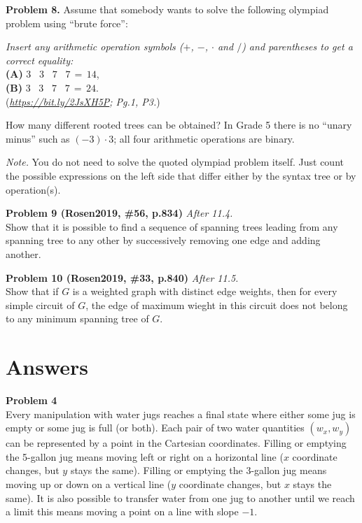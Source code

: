 \documentclass[jou]{apa6}
\begin{document}
\vspace{6pt}
{\bf Problem 8.}
Assume that somebody wants to solve the following olympiad problem using ``brute force'':
\begin{mdframed}[roundcorner=6pt]
{\em Insert any arithmetic operation symbols ($+$, $-$, $\cdot$ and $/$) and
parentheses to get a correct equality:}\\
{\bf (A)} $3\;\;\;3\;\;\;7\;\;\;7\,=\,14$,\\
{\bf (B)} $3\;\;\;3\;\;\;7\;\;\;7\,=\,24$.\\
({\em \url{https://bit.ly/2JsXH5P}; Pg.1, P3.})
\end{mdframed}
How many different rooted trees can be obtained?
In Grade 5 there is no ``unary minus'' such as $(-3)\cdot 3$;
all four arithmetic operations are binary.

{\em Note.} 
You do not need to solve the quoted olympiad 
problem itself. Just count the possible expressions on the left side
that differ either by the syntax tree or by operation(s).

\vspace{6pt}
{\bf Problem 9 (Rosen2019, \#56, p.834)} \textendash{} {\em After 11.4.}\\
Show that it is possible to find a sequence of spanning trees leading from any spanning tree
to any other by successively removing one edge and adding another.

\vspace{6pt}
{\bf Problem 10 (Rosen2019, \#33, p.840)} \textendash{} {\em After 11.5.}\\
Show that if $G$ is a weighted graph with distinct edge weights, then for every simple
circuit of $G$, the edge of maximum wieght in this circuit 
does not belong to any minimum spanning tree of $G$.



\newpage

\section{Answers}


{\bf Problem 4}\\
Every manipulation with water jugs reaches a final 
state where either some jug is empty or some jug is full 
(or both). Each pair of two water quantities $(w_x,w_y)$
can be represented by a point in the Cartesian coordinates. 
Filling or emptying the 5-gallon jug means moving left or right 
on a horizontal line ($x$ coordinate changes, but $y$ stays the same). 
Filling or emptying the 3-gallon jug means moving up or down 
on a vertical line ($y$ coordinate changes, but $x$ stays the same). 
It is also possible to transfer water from one jug to another 
until we reach a limit \textendash{} this means moving a 
point on a line with slope $-1$. 
\end{document}
